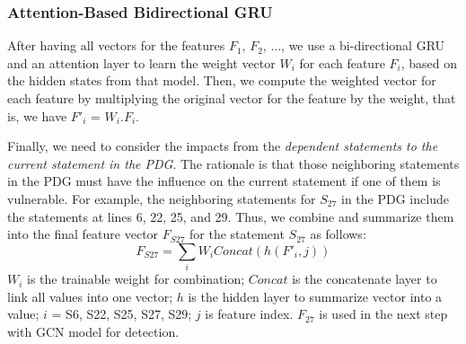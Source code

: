 
\vspace{-1pt}
\subsubsection{Attention-Based Bidirectional GRU} 

After having all vectors for the features $F_1$, $F_2$, ..., we use a
bi-directional GRU and an attention layer to learn the weight
vector $W_i$ for each feature $F_i$, based on the hidden states from
that model.  Then, we compute the weighted vector for each feature by
multiplying the original vector for the feature by the weight, that is, we have $F'_i$
= $W_i$.$F_i$.

%



Finally, we need to consider the impacts from the {\em dependent statements to
  the current statement in the PDG}. The rationale is that those
neighboring statements in the PDG must have the influence on the
current statement if one of them is vulnerable. For example, the
neighboring statements for $S_{27}$ in the PDG include the statements
at lines 6, 22, 25, and 29. Thus, we combine and summarize them into
the final feature vector $F_{S27}$ for the statement $S_{27}$
as follows:
\begin{equation}\label{eq:9}
F_{S27} = \sum_i{W_i{Concat(h(F'_i,j))}}
\end{equation}
$W_i$ is the trainable weight for combination; $Concat$ is the
concatenate layer to link all values into one vector; $h$ is the
hidden layer to summarize vector into a value; $i$ = S6, S22, S25,
S27, S29; $j$ is feature index. $F_{27}$ is used in the next step
with GCN model for detection.



